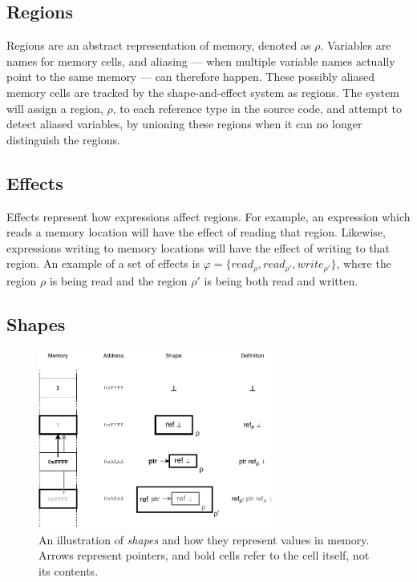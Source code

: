 \subsection{Regions}
Regions are an abstract representation of memory, denoted as $\rho$. Variables are names for memory cells, and aliasing --- when multiple variable names actually point to the same memory --- can therefore happen. These possibly aliased memory cells are tracked by the shape-and-effect system as regions. The system will assign a region, $\rho$, to each reference type in the source code, and attempt to detect aliased variables, by unioning these regions when it can no longer distinguish the regions.

\subsection{Effects}
Effects represent how expressions affect regions. For example, an expression which reads a memory location will have the effect of reading that region. Likewise, expressions writing to memory locations will have the effect of writing to that region. An example of a set of effects is $\varphi = \{read_\rho , read_{\rho'} , write_{\rho'}\}$, where the region $\rho$ is being read and the region $\rho'$ is being both read and written.

\subsection{Shapes}
\begin{figure}[H]
    \centering
    \includegraphics[width=0.7\textwidth]{background/figures/shapes}
    \caption{An illustration of \textit{shapes} and how they represent values in memory. Arrows represent pointers, and bold cells refer to the cell itself, not its contents.}
    \label{shapes-figure}
\end{figure}


